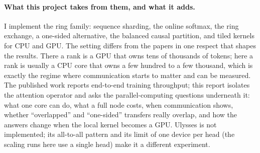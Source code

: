 \paragraph{What this project takes from them, and what it adds.} I implement the
ring family: sequence sharding, the online softmax, the ring exchange, a
one-sided alternative, the balanced causal partition, and tiled kernels for CPU and
GPU. The setting differs from the papers in one respect that shapes the results.
There a rank is a GPU that owns tens of thousands of tokens; here a rank is usually
a CPU core that owns a few hundred to a few thousand, which is exactly the regime
where communication starts to matter and can be measured. The published work
reports end-to-end training throughput; this report isolates the attention operator
and asks the parallel-computing questions underneath it: what one core can do,
what a full node costs, when communication shows, whether ``overlapped'' and
``one-sided'' transfers really overlap, and how the answers change when the local
kernel becomes a GPU. Ulysses is not implemented; its all-to-all pattern and its
limit of one device per head (the scaling runs here use a single head) make it a
different experiment.
